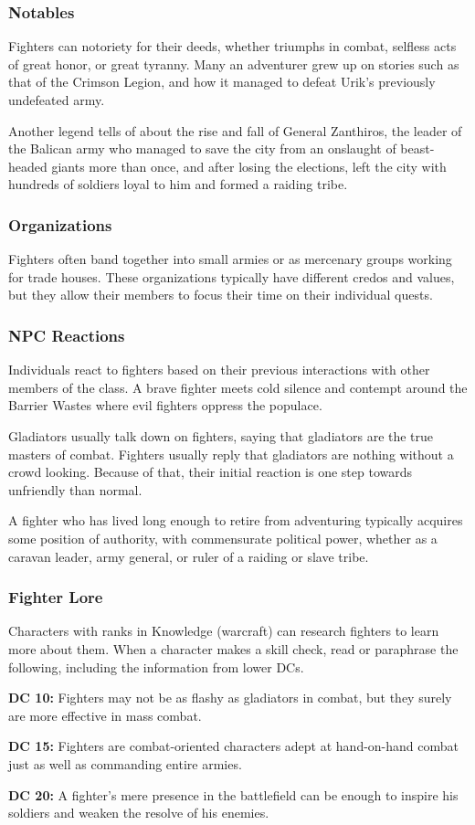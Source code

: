 \subsubsection{Notables}

Fighters can notoriety for their deeds, whether triumphs in combat, selfless acts of great honor, or great tyranny. Many an adventurer grew up on stories such as that of the Crimson Legion, and how it managed to defeat Urik's previously undefeated army.

Another legend tells of about the rise and fall of General Zanthiros, the leader of the Balican army who managed to save the city from an onslaught of beast-headed giants more than once, and after losing the elections, left the city with hundreds of soldiers loyal to him and formed a raiding tribe.

\subsubsection{Organizations}

Fighters often band together into small armies or as mercenary groups working for trade houses. These organizations typically have different credos and values, but they allow their members to focus their time on their individual quests.

\subsubsection{NPC Reactions}

Individuals react to fighters based on their previous interactions with other members of the class. A brave fighter meets cold silence and contempt around the Barrier Wastes where evil fighters oppress the populace.

Gladiators usually talk down on fighters, saying that gladiators are the true masters of combat. Fighters usually reply that gladiators are nothing without a crowd looking. Because of that, their initial reaction is one step towards unfriendly than normal.

A fighter who has lived long enough to retire from adventuring typically acquires some position of authority, with commensurate political power, whether as a caravan leader, army general, or ruler of a raiding or slave tribe.

\subsubsection{Fighter Lore}

Characters with ranks in Knowledge (warcraft) can research fighters to learn more about them. When a character makes a skill check, read or paraphrase the following, including the information from lower DCs.

\textbf{DC 10:} Fighters may not be as flashy as gladiators in combat, but they surely are more effective in mass combat.

\textbf{DC 15:} Fighters are combat-oriented characters adept at hand-on-hand combat just as well as commanding entire armies.

\textbf{DC 20:} A fighter's mere presence in the battlefield can be enough to inspire his soldiers and weaken the resolve of his enemies.
